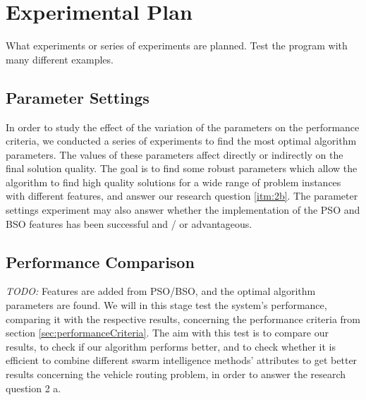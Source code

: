 \section{Experimental Plan}

What experiments or series of experiments are planned. Test the program with many different examples.

\subsection{Parameter Settings}
\label{subsec:parameterSettings_plan}

In order to study the effect of the variation of the parameters on the performance criteria, we conducted a series of experiments to find the most optimal algorithm parameters. The values of these parameters affect directly or indirectly on the final solution quality. The goal is to find some robust parameters which allow the algorithm to find high quality solutions for a wide range of problem instances with different features, and answer our research question \vref{itm:2b}. The parameter settings experiment may also answer whether the implementation of the PSO and BSO features has been successful and / or advantageous. 

\subsection{Performance Comparison}
\emph{\color{blue}TODO:} Features are added from PSO/BSO, and the optimal algorithm parameters are found. We will in this stage test the system's performance, comparing it with the respective results, concerning the performance criteria from section \vref{sec:performanceCriteria}. %
The aim with this test is to compare our results, to check if our algorithm performs better, and to check whether it is efficient to combine different swarm intelligence methods' attributes to get better results concerning the vehicle routing problem, in order to answer the research question 2 a.


